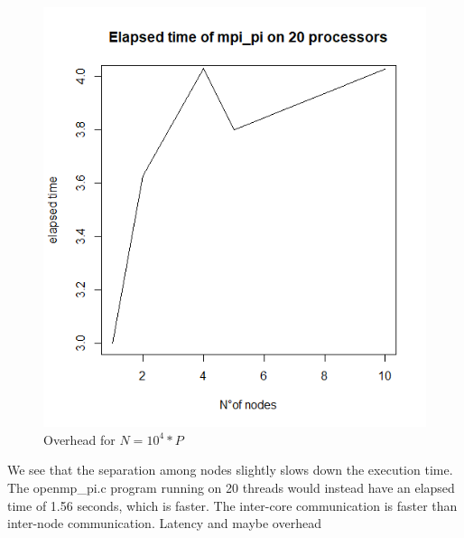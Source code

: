 \documentclass{article}
\begin{document}
\begin{figure}[H] %
	\centering
	\includegraphics[width=0.8\columnwidth]{graphs/mpi_pi_elaps_time_on_nodes} %
	\caption{Overhead for $N=10^4*P$}
\end{figure}

We see that the separation among nodes slightly slows down the execution time. The openmp_pi.c program running on 20 threads would instead have an elapsed time of 1.56 seconds, which is faster. The inter-core communication is faster than inter-node communication. Latency and maybe overhead





\end{document}
